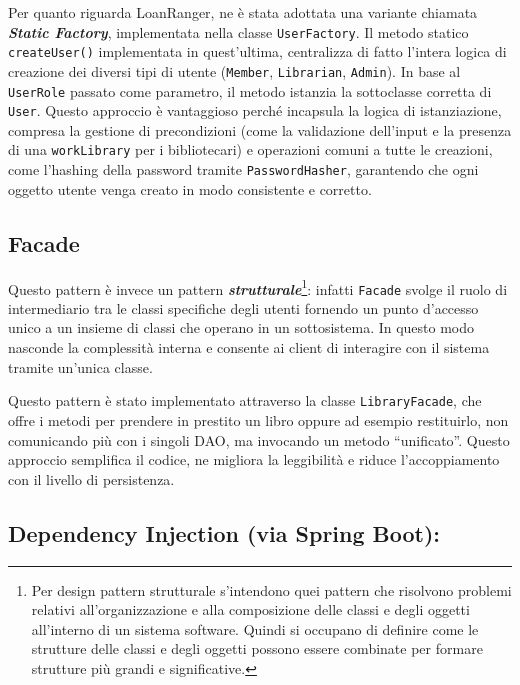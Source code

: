 \documentclass[
  italian,
  paper=a4,
  ,captions=tableheading
]{scrbook}
\newcommand{\passthrough}[1]{#1}
\begin{document}
Per quanto riguarda LoanRanger, ne è stata adottata una variante
chiamata \textbf{\emph{Static Factory}}, implementata nella classe
\passthrough{\lstinline!UserFactory!}. Il metodo statico
\passthrough{\lstinline!createUser()!} implementata in quest'ultima,
centralizza di fatto l'intera logica di creazione dei diversi tipi di
utente (\passthrough{\lstinline!Member!},
\passthrough{\lstinline!Librarian!}, \passthrough{\lstinline!Admin!}).
In base al \passthrough{\lstinline!UserRole!} passato come parametro, il
metodo istanzia la sottoclasse corretta di
\passthrough{\lstinline!User!}. Questo approccio è vantaggioso perché
incapsula la logica di istanziazione, compresa la gestione di
precondizioni (come la validazione dell'input e la presenza di una
\passthrough{\lstinline!workLibrary!} per i bibliotecari) e operazioni
comuni a tutte le creazioni, come l'hashing della password tramite
\passthrough{\lstinline!PasswordHasher!}, garantendo che ogni oggetto
utente venga creato in modo consistente e corretto.

\subsection{Facade}\label{facade}

Questo pattern è invece un pattern
\textbf{\emph{strutturale}}\footnote{Per design pattern strutturale s’intendono quei pattern che risolvono problemi relativi all’organizzazione e alla composizione delle classi e degli oggetti all’interno di un sistema software. Quindi si occupano di definire come le strutture delle classi e degli oggetti possono essere combinate per formare strutture più grandi e significative.}:
infatti \passthrough{\lstinline!Facade!} svolge il ruolo di
intermediario tra le classi specifiche degli utenti fornendo un punto
d'accesso unico a un insieme di classi che operano in un sottosistema.
In questo modo nasconde la complessità interna e consente ai client di
interagire con il sistema tramite un'unica classe.

Questo pattern è stato implementato attraverso la classe
\passthrough{\lstinline!LibraryFacade!}, che offre i metodi per prendere
in prestito un libro oppure ad esempio restituirlo, non comunicando più
con i singoli DAO, ma invocando un metodo ``unificato''. Questo
approccio semplifica il codice, ne migliora la leggibilità e riduce
l'accoppiamento con il livello di persistenza.

\subsection{Dependency Injection (via Spring
Boot):}\label{dependency-injection-via-spring-boot}
\end{document}
